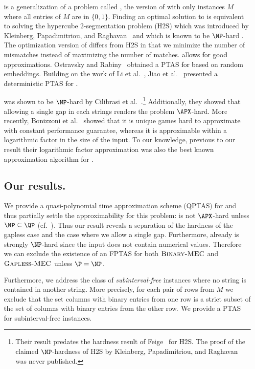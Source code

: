 \GMEC is a generalization of a problem called \BMEC, the version of \MEC with only instances $M$ where all entries of $M$ are in $\{0,1\}$.
Finding an optimal solution to \BMEC is equivalent to solving the hypercube 2-segmentation problem (H2S) which was introduced by Kleinberg, Papadimitriou, and Raghavan~\cite{KPR98_segmentation,KPR04_segmentation} and which is known to be $\NP$-hard \cite{Fei14_np,KPR04_segmentation}.
The optimization version of \BMEC  differs from H2S in that we minimize the number of mismatches instead of maximizing the number of matches.
\BMEC allows for good approximations.
Ostravsky and Rabiny~\cite{OR02_polynomial} obtained a PTAS for \BMEC based on random embeddings.
Building on the work of Li et al.~\cite{LMW02_finding}, Jiao et al.~\cite{JXL04_k} presented a deterministic PTAS for \BMEC.

\GMEC was shown to be $\NP$-hard by Cilibrasi et al.~\cite{CIKT07_complexity}.\footnote{Their result predates the hardness result of Feige~\cite{Fei14_np} for H2S. The proof of the claimed $\NP$-hardness of H2S by Kleinberg, Papadimitriou, and Raghavan~\cite{KPR98_segmentation} was never published.}
Additionally, they showed that allowing a single gap in each strings renders the problem $\APX$-hard.
More recently, Bonizzoni et al.~\cite{BDK+16_minimum} showed that it is unique games hard to approximate \MEC with constant performance guarantee, whereas it is approximable within a logarithmic factor in the size of the input. 
To our knowledge, previous to our result their logarithmic factor approximation was also the best known approximation algorithm for \GMEC.

\subsection{Our results.}
We provide a quasi-polynomial time approximation scheme (QPTAS) for \GMEC and thus partially settle the approximability for this problem: \GMEC is not $\APX$-hard unless $\NP \subseteq \QP$ (cf.~\cite{RS09_approximation}).
Thus our result reveals a separation of the hardness of the gapless case and the case where we allow a single gap.
Furthermore, already \BMEC is strongly $\NP$-hard since the input does not contain numerical values. 
Therefore we can exclude the existence of an FPTAS for both $\textsc{Binary-MEC}$ and $\textsc{Gapless-MEC}$ unless $\P = \NP$.

Furthermore, we address the class of \emph{subinterval-free} \GMEC instances where no string is contained in another string.
More precisely, for each pair of rows from $M$ we exclude that the set columns with binary entries from one row is a strict subset of
the set of columns with binary entries from the other row.
We provide a PTAS for subinterval-free instances.

